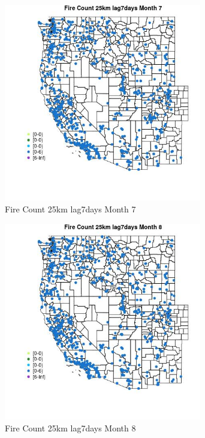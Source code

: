 \begin{figure} 
\centering  
\includegraphics[width=0.77\textwidth]{Code_Outputs/Report_ML_input_PM25_Step4_part_e_de_duplicated_aves_compiled_2019-05-21wNAs_MapObsMo7Fire_Count_25km_lag7days.jpg} 
\caption{\label{fig:Report_ML_input_PM25_Step4_part_e_de_duplicated_aves_compiled_2019-05-21wNAsMapObsMo7Fire_Count_25km_lag7days}Fire Count 25km lag7days Month 7} 
\end{figure} 
 

\begin{figure} 
\centering  
\includegraphics[width=0.77\textwidth]{Code_Outputs/Report_ML_input_PM25_Step4_part_e_de_duplicated_aves_compiled_2019-05-21wNAs_MapObsMo8Fire_Count_25km_lag7days.jpg} 
\caption{\label{fig:Report_ML_input_PM25_Step4_part_e_de_duplicated_aves_compiled_2019-05-21wNAsMapObsMo8Fire_Count_25km_lag7days}Fire Count 25km lag7days Month 8} 
\end{figure} 
 

